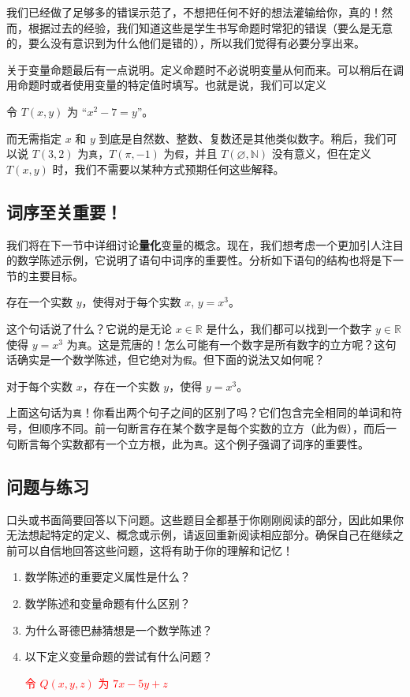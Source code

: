我们已经做了足够多的错误示范了，不想把任何不好的想法灌输给你，真的！然而，根据过去的经验，我们知道这些是学生书写命题时常犯的错误（要么是无意的，要么没有意识到为什么他们是错的），所以我们觉得有必要分享出来。

关于变量命题最后有一点说明。定义命题时不必说明变量从何而来。可以稍后在调用命题时或者使用变量的特定值时填写。也就是说，我们可以定义
\begin{center}
    令 $T(x, y)$ 为 ``$x^2 - 7 = y$''。
\end{center}
而无需指定 $x$ 和 $y$ 到底是自然数、整数、复数还是其他类似数字。稍后，我们可以说 $T(3, 2)$ 为\verb|真|，$T(\pi, -1)$ 为\verb|假|，并且 $T(\varnothing, \mathbb{N})$ 没有意义，但在定义 $T(x, y)$ 时，我们不需要以某种方式预期任何这些解释。

\subsection{词序至关重要！}\label{sec:section4.2.4}

我们将在下一节中详细讨论\textbf{量化}变量的概念。现在，我们想考虑一个更加引人注目的数学陈述示例，它说明了语句中词序的重要性。分析如下语句的结构也将是下一节的主要目标。
\begin{center}
    存在一个实数 $y$，使得对于每个实数 $x$, $y = x^3$。
\end{center}
这个句话说了什么？它说的是无论 $x \in \mathbb{R}$ 是什么，我们都可以找到一个数字 $y \in \mathbb{R}$ 使得 $y = x^3$ 为\verb|真|。这是荒唐的！怎么可能有一个数字是所有数字的立方呢？这句话确实是一个数学陈述，但它绝对为\verb|假|。但下面的说法又如何呢？
\begin{center}
    对于每个实数 $x$，存在一个实数 $y$，使得 $y = x^3$。
\end{center}
上面这句话为\verb|真|！你看出两个句子之间的区别了吗？它们包含完全相同的单词和符号，但顺序不同。前一句断言存在某个数字是每个实数的立方（此为\verb|假|），而后一句断言每个实数都有一个立方根，此为\verb|真|。这个例子强调了词序的重要性。

\subsection{问题与练习}

口头或书面简要回答以下问题。这些题目全都基于你刚刚阅读的部分，因此如果你无法想起特定的定义、概念或示例，请返回重新阅读相应部分。确保自己在继续之前可以自信地回答这些问题，这将有助于你的理解和记忆！

\begin{enumerate}[label=(\arabic*)]
    \item 数学陈述的重要定义属性是什么？
    \item 数学陈述和变量命题有什么区别？
    \item 为什么哥德巴赫猜想是一个数学陈述？
    \item 以下定义变量命题的尝试有什么问题？
        \begin{center}
            \textcolor{red}{令 $Q(x, y, z)$ 为 $7x - 5y + z$}
        \end{center}
\end{enumerate}

